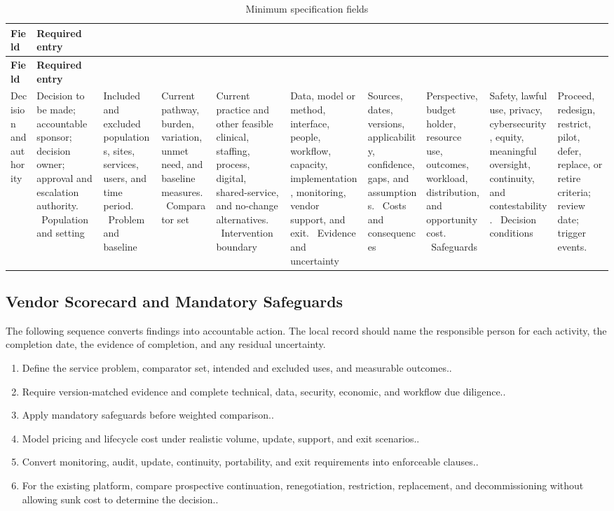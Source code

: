 \begin{longtable}{@{}p{}p{}@{}}
\caption{Minimum specification fields}
\label{tab:comp-ch09-spec-fields}\\
\toprule
\textbf{Field} & \textbf{Required entry} \\
\midrule
\endfirsthead
\toprule
\textbf{Field} & \textbf{Required entry} \\
\midrule
\endhead
\bottomrule
\endlastfoot
Decision and authority & Decision to be made; accountable sponsor; decision owner; approval and escalation authority. \
Population and setting & Included and excluded populations, sites, services, users, and time period. \
Problem and baseline & Current pathway, burden, variation, unmet need, and baseline measures. \
Comparator set & Current practice and other feasible clinical, staffing, process, digital, shared-service, and no-change alternatives. \
Intervention boundary & Data, model or method, interface, people, workflow, capacity, implementation, monitoring, vendor support, and exit. \
Evidence and uncertainty & Sources, dates, versions, applicability, confidence, gaps, and assumptions. \
Costs and consequences & Perspective, budget holder, resource use, outcomes, workload, distribution, and opportunity cost. \
Safeguards & Safety, lawful use, privacy, cybersecurity, equity, meaningful oversight, continuity, and contestability. \
Decision conditions & Proceed, redesign, restrict, pilot, defer, replace, or retire criteria; review date; trigger events. \
\end{longtable}

\subsection{Vendor Scorecard and Mandatory Safeguards}
\label{sec:comp-ch09-supp-2}
The following sequence converts findings into accountable action. The local record
should name the responsible person for each activity, the completion date, the
evidence of completion, and any residual uncertainty.

\begin{enumerate}
 \item Define the service problem, comparator set, intended and excluded uses, and measurable outcomes..
 \item Require version-matched evidence and complete technical, data, security, economic, and workflow due diligence..
 \item Apply mandatory safeguards before weighted comparison..
 \item Model pricing and lifecycle cost under realistic volume, update, support, and exit scenarios..
 \item Convert monitoring, audit, update, continuity, portability, and exit requirements into enforceable clauses..
 \item For the existing platform, compare prospective continuation, renegotiation, restriction, replacement, and decommissioning without allowing sunk cost to determine the decision..
\end{enumerate}

